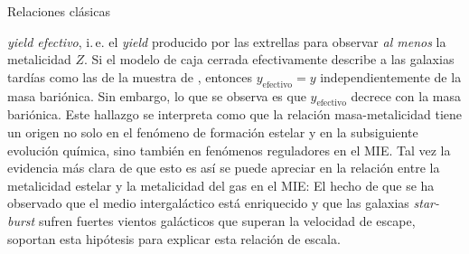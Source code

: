 \documentclass[xcolor=dvipsnames,4pt,hyperref={colorlinks,citecolor=black,linkcolor=black,urlcolor=black}]{beamer}
\begin{document}
\begin{frame}{Relaciones clásicas}
\begin{description}
\emph{yield efectivo}, i.\,e. el \emph{yield} producido por las extrellas para observar \emph{al
menos} la metalicidad $Z$. Si el modelo de caja cerrada efectivamente describe a las galaxias
tardías como las de la muestra de \citeauthor{Tremonti2004}, entonces $y_\text{efectivo}=y$
independientemente de la masa bariónica. Sin embargo, lo que se observa es que $y_\text{efectivo}$
decrece con la masa bariónica.
Este hallazgo se interpreta como que la relación masa-metalicidad tiene un origen no solo en el
fenómeno de formación estelar y en la subsiguiente evolución química, sino también en fenómenos
reguladores en el MIE. Tal vez la evidencia más clara de que esto es así se puede apreciar en la
relación entre la metalicidad estelar y la metalicidad del gas en el MIE:
El hecho de que se ha observado que el medio intergaláctico está enriquecido y que las galaxias
\emph{star-burst} sufren fuertes vientos galácticos que superan la velocidad de escape, soportan
esta hipótesis para explicar esta relación de escala.


\end{description}
\end{frame}
\end{document}
